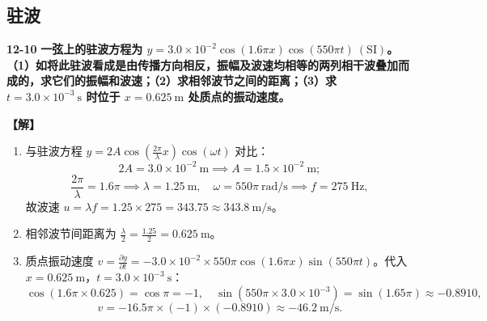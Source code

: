 \documentclass[zihao=5,a4paper,UTF8]{ctexart}
\newenvironment{prob}[2]{%
    \par\vspace{6pt}\noindent\textbf{\color{navy}#1} \textbf{#2}\par\nopagebreak\vspace{2pt}%
}{%
    \par\vspace{4pt}%
}
\newcommand{\sol}{\noindent\textbf{\color{tealaccent}【解】}\ }
\begin{document}
\subsection{驻波}

\begin{prob}{12-10}{一弦上的驻波方程为 $y = 3.0\times 10^{-2}\cos(1.6\pi x)\cos(550\pi t)\ (\mathrm{SI})$。（1）如将此驻波看成是由传播方向相反，振幅及波速均相等的两列相干波叠加而成的，求它们的振幅和波速；（2）求相邻波节之间的距离；（3）求 $t = 3.0\times 10^{-3}\ \mathrm{s}$ 时位于 $x = 0.625\ \mathrm{m}$ 处质点的振动速度。}
\sol
\begin{enumerate}[leftmargin=2em, itemsep=2pt]
    \item 与驻波方程 $y = 2A\cos\left(\frac{2\pi}{\lambda}x\right)\cos(\omega t)$ 对比：
    \[
        2A = 3.0\times 10^{-2}\ \mathrm{m} \implies A = 1.5\times 10^{-2}\ \mathrm{m};
    \]
    \[
        \frac{2\pi}{\lambda} = 1.6\pi \implies \lambda = 1.25\ \mathrm{m},\quad \omega = 550\pi\ \mathrm{rad/s} \implies f = 275\ \mathrm{Hz},
    \]
    故波速 $u = \lambda f = 1.25\times 275 = 343.75 \approx 343.8\ \mathrm{m/s}$。
    \item 相邻波节间距离为 $\frac{\lambda}{2} = \frac{1.25}{2} = 0.625\ \mathrm{m}$。
    \item 质点振动速度 $v = \frac{\partial y}{\partial t} = -3.0\times 10^{-2}\times 550\pi\cos(1.6\pi x)\sin(550\pi t)$。代入 $x=0.625\ \mathrm{m}$，$t=3.0\times 10^{-3}\ \mathrm{s}$：
    \[
        \cos(1.6\pi\times 0.625) = \cos\pi = -1,\quad \sin(550\pi\times 3.0\times 10^{-3}) = \sin(1.65\pi) \approx -0.8910,
    \]
    \[
        v = -16.5\pi\times (-1)\times (-0.8910) \approx -46.2\ \mathrm{m/s}.
    \]
\end{enumerate}
\end{prob}
\end{document}
